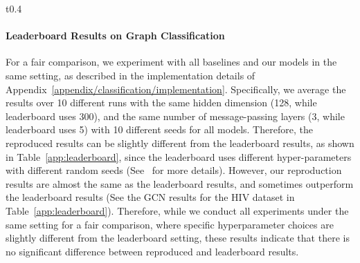\documentclass{article} \usepackage{iclr2021_conference,times}
\begin{document}
\begin{wraptable}{t}{0.4\textwidth}
    \vspace{-0.3in}
    \small
    \centering
    \caption{\small Graph classification results for OGB test datasets with standard deviations.}
    \vskip -0.15in
    \label{app:leaderboard}
\end{wraptable}

\paragraph{Leaderboard Results on Graph Classification}
For a fair comparison, we experiment with all baselines and our models in the same setting, as described in the implementation details of Appendix~\ref{appendix/classification/implementation}. Specifically, we average the results over 10 different runs with the same hidden dimension (128, while leaderboard uses 300), and the same number of message-passing layers (3, while leaderboard uses 5) with 10 different seeds for all models. Therefore, the reproduced results can be slightly different from the leaderboard results, as shown in Table~\ref{app:leaderboard}, since the leaderboard uses different hyper-parameters with different random seeds (See~\cite{OGB} for more details). However, our reproduction results are almost the same as the leaderboard results, and sometimes outperform the leaderboard results (See the GCN results for the HIV dataset in Table~\ref{app:leaderboard}). Therefore, while we conduct all experiments under the same setting for a fair comparison, where specific hyperparameter choices are slightly different from the leaderboard setting, these results indicate that there is no significant difference between reproduced and leaderboard results.
\end{document}
